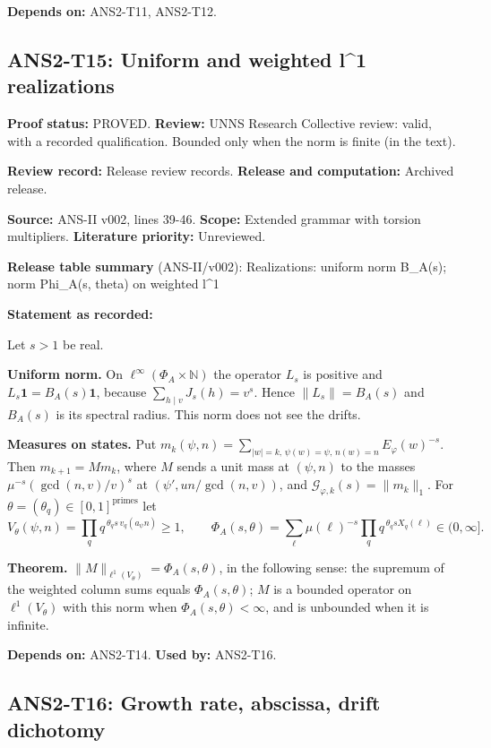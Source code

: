\documentclass[
  11pt,
]{article}
\begin{document}
\textbf{Depends on:} ANS2-T11, ANS2-T12.

\hypertarget{ans2-t15-uniform-and-weighted-l1-realizations}{%
\subsection{ANS2-T15: Uniform and weighted l\^{}1
realizations}\label{ans2-t15-uniform-and-weighted-l1-realizations}}

\textbf{Proof status:} PROVED. \textbf{Review:} UNNS Research Collective
review: valid, with a recorded qualification. Bounded only when the norm
is finite (in the text).

\textbf{Review record:} Release review records. \textbf{Release and
computation:} Archived release.

\textbf{Source:} ANS-II v002, lines 39-46. \textbf{Scope:} Extended
grammar with torsion multipliers. \textbf{Literature priority:}
Unreviewed.

\textbf{Release table summary} (ANS-II/v002): Realizations: uniform norm
B\_A(s); norm Phi\_A(s, theta) on weighted l\^{}1

\textbf{Statement as recorded:}

Let \(s>1\) be real.

\textbf{Uniform norm.} On \(\ell^\infty(\Phi_A\times\mathbb N)\) the
operator \(L_s\) is positive and \(L_s\mathbf 1=B_A(s)\mathbf 1\),
because \(\sum_{h\mid v}J_s(h)=v^s\). Hence \(\|L_s\|=B_A(s)\) and
\(B_A(s)\) is its spectral radius. This norm does not see the drifts.

\textbf{Measures on states.} Put
\(m_k(\psi,n)=\sum_{|w|=k,\,\psi(w)=\psi,\,n(w)=n}E_\varphi(w)^{-s}\).
Then \(m_{k+1}=Mm_k\), where \(M\) sends a unit mass at \((\psi,n)\) to
the masses \(\mu^{-s}(\gcd(n,v)/v)^s\) at \((\psi',un/\gcd(n,v))\), and
\(\mathcal G_{\varphi,k}(s)=\|m_k\|_1\). For
\(\theta=(\theta_q)\in[0,1]^{\text{primes}}\) let
\[V_\theta(\psi,n)=\prod_qq^{\,\theta_qs\,v_q(a_\psi n)}\ge1,\qquad\Phi_A(s,\theta)=\sum_\ell\mu(\ell)^{-s}\prod_qq^{\,\theta_qsX_q(\ell)}\in(0,\infty].\]

\textbf{Theorem.} \(\|M\|_{\ell^1(V_\theta)}=\Phi_A(s,\theta)\), in the
following sense: the supremum of the weighted column sums equals
\(\Phi_A(s,\theta)\); \(M\) is a bounded operator on
\(\ell^1(V_\theta)\) with this norm when \(\Phi_A(s,\theta)<\infty\),
and is unbounded when it is infinite.

\textbf{Depends on:} ANS2-T14. \textbf{Used by:} ANS2-T16.

\hypertarget{ans2-t16-growth-rate-abscissa-drift-dichotomy}{%
\subsection{ANS2-T16: Growth rate, abscissa, drift
dichotomy}\label{ans2-t16-growth-rate-abscissa-drift-dichotomy}}
\end{document}
